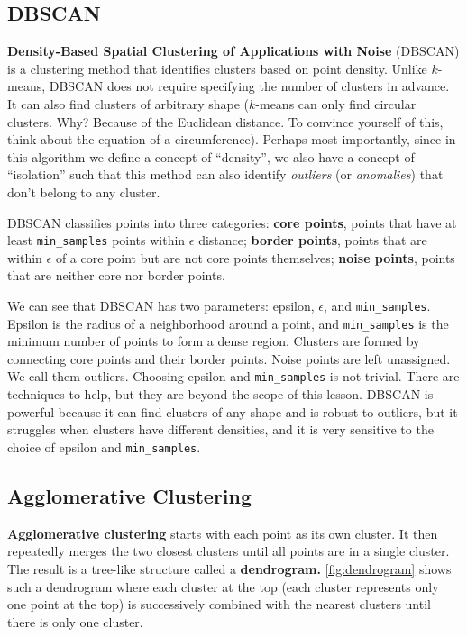 \subsection*{DBSCAN}
\textbf{Density-Based Spatial Clustering of Applications with Noise} (DBSCAN) is a clustering method that identifies clusters based on point density. Unlike $k$-means, DBSCAN does not require specifying the number of clusters in advance. It can also find clusters of arbitrary shape ($k$-means can only find circular clusters. Why? Because of the Euclidean distance. To convince yourself of this, think about the equation of a circumference). Perhaps most importantly, since in this algorithm we define a concept of ``density'', we also have a concept of ``isolation'' such that this method can also identify \emph{outliers} (or \emph{anomalies}) that don't belong to any cluster.

DBSCAN classifies points into three categories: \textbf{core points}, points that have at least \texttt{min\_samples} points within $\epsilon$ distance; \textbf{border points}, points that are within $\epsilon$ of a core point but are not core points themselves; \textbf{noise points}, points that are neither core nor border points.

We can see that DBSCAN has two parameters: epsilon, $\epsilon$, and \texttt{min\_samples}. Epsilon is the radius of a neighborhood around a point, and \texttt{min\_samples} is the minimum number of points to form a dense region. Clusters are formed by connecting core points and their border points. Noise points are left unassigned. We call them outliers. Choosing epsilon and \texttt{min\_samples} is not trivial. There are techniques to help, but they are beyond the scope of this lesson. DBSCAN is powerful because it can find clusters of any shape and is robust to outliers, but it struggles when clusters have different densities, and it is very sensitive to the choice of epsilon and \texttt{min\_samples}.

\subsection*{Agglomerative Clustering}
\textbf{Agglomerative clustering} starts with each point as its own cluster. It then repeatedly merges the two closest clusters until all points are in a single cluster. The result is a tree-like structure called a \textbf{dendrogram.} \autoref{fig:dendrogram} shows such a dendrogram where each cluster at the top (each cluster represents only one point at the top) is successively combined with the nearest clusters until there is only one cluster.  

